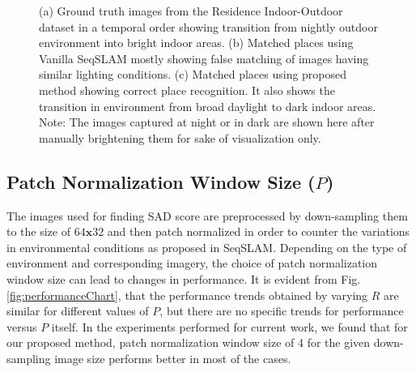 \documentclass[letterpaper, 10 pt, conference]{ieeeconf}  %
\begin{document}
\begin{figure}[htbp]
\begin{tabular}{ccc}
 
\end{tabular}
\caption{(a) Ground truth images from the Residence Indoor-Outdoor dataset in a temporal order showing transition from nightly outdoor environment into bright indoor areas. (b) Matched places using Vanilla SeqSLAM mostly showing false matching of images having similar lighting conditions. (c) Matched places using proposed method showing correct place recognition. It also shows the transition in environment from broad daylight to dark indoor areas. Note: The images captured at night or in dark are shown here after manually brightening them for sake of visualization only.}
\label{fig:rioTransImages}
\end{figure}


\subsection{Patch Normalization Window Size ($P$)}
The images used for finding SAD score are preprocessed by down-sampling them to the size of $64\mathbf{x}32$ and then patch normalized in order to counter the variations in environmental conditions as proposed in SeqSLAM. Depending on the type of environment and corresponding imagery, the choice of patch normalization window size can lead to changes in performance. It is evident from Fig. \ref{fig:performanceChart}, that the performance trends obtained by varying $R$ are similar for different values of $P$, but there are no specific trends for performance versus $P$ itself. In the experiments performed for current work, we found that for our proposed method, patch normalization window size of 4 for the given down-sampling image size performs better in most of the cases.
\end{document}
